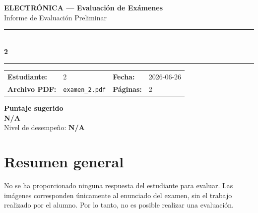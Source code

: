 \documentclass[11pt,a4paper]{article}
\begin{document}
\begin{center}
  {\Large\bfseries\color{azulTitulo} ELECTRÓNICA --- Evaluación de Exámenes}\\[4pt]
  {\large Informe de Evaluación Preliminar}\\[12pt]
  \rule{\linewidth}{1.2pt}\\[6pt]
  {\LARGE\bfseries 2}\\[4pt]
  \rule{\linewidth}{0.6pt}
\end{center}

\vspace{4pt}
\begin{tcolorbox}[cajaTitulo, title=Datos del informe]
\begin{tabular}{@{}llll@{}}
  \textbf{Estudiante:}  & 2  &
  \textbf{Fecha:}       & 2026-06-26 \\[4pt]
  \textbf{Archivo PDF:} & \texttt{examen\_2.pdf}  &
  \textbf{Páginas:}     & 2 \\
\end{tabular}
\end{tcolorbox}

\vspace{6pt}
\begin{center}
  \begin{tcolorbox}[
    enhanced,
    colback=white, colframe=desempeno_bueno,
    width=0.62\linewidth,
    boxrule=2pt,
    halign=center, valign=center,
    top=8pt, bottom=8pt,
  ]
    \centering
    {\large\bfseries Puntaje sugerido}\\[6pt]
    {\Huge\bfseries\color{desempeno_bueno} N/A}\\[6pt]
    {\large Nivel de desempeño: \textbf{\color{desempeno_bueno} N/A}}
  \end{tcolorbox}
\end{center}

\section*{Resumen general}
No se ha proporcionado ninguna respuesta del estudiante para evaluar. Las imágenes corresponden únicamente al enunciado del examen, sin el trabajo realizado por el alumno. Por lo tanto, no es posible realizar una evaluación.
\end{document}
